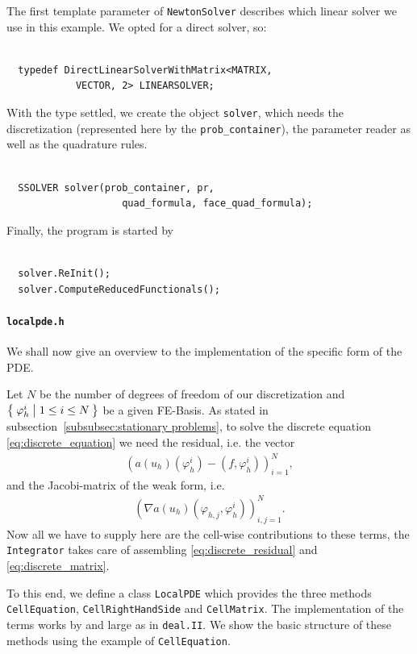\documentclass[prodmode,acmtoms]{acmsmall}
\numberwithin{equation}{section}
\renewcommand{\phi}{\varphi}
\newcommand{\deal}{\texttt{deal.II}}
\begin{document}
The first template parameter of \texttt{NewtonSolver} describes which linear solver we use in this example. We opted for a direct solver, so: 
\begin{lstlisting}
  
  typedef DirectLinearSolverWithMatrix<MATRIX,
            VECTOR, 2> LINEARSOLVER;

\end{lstlisting}
With the type settled, we create the object \texttt{solver}, which needs the discretization (represented here by the \texttt{prob\_container}), the parameter reader as well as the quadrature rules.
\begin{lstlisting}

  SSOLVER solver(prob_container, pr,
                    quad_formula, face_quad_formula);

\end{lstlisting}
Finally, the program is started by
\begin{lstlisting}

  solver.ReInit();
  solver.ComputeReducedFunctionals();

\end{lstlisting}

\paragraph{\texttt{localpde.h}}
We shall now give an overview to the implementation of the specific form of the PDE. 

Let $N$ be the number of degrees of freedom of our discretization and $\Set{\phi_{h}^{i}|1\leq i \leq N}$ be a given FE-Basis. As stated in subsection~\ref{subsubsec:stationary problems}, to solve the discrete equation \eqref{eq:discrete_equation} we need the residual, i.e. the vector
\begin{align}\label{eq:discrete_residual}
\left(a(u_h)(\phi_{h}^{i})-(f,\phi_{h}^{i})\right)_{i=1}^N,
\end{align}
and the Jacobi-matrix of the weak form, i.e.
\begin{align}\label{eq:discrete_matrix}
\left(\nabla a(u_h)(\phi_{h,j},\phi_{h}^{i})\right)_{i,j=1}^N.
\end{align}
Now all we have to supply here are the cell-wise contributions to these terms, the \texttt{Integrator} takes care of assembling \eqref{eq:discrete_residual} and \eqref{eq:discrete_matrix}.

To this end, we define a class \texttt{LocalPDE} which provides the three methods
\texttt{CellEquation}, \texttt{CellRightHandSide} and \texttt{CellMatrix}. The implementation of the terms works by and large as in \deal{}. We show the basic structure of these methods using the example of \texttt{CellEquation}.
\end{document}
